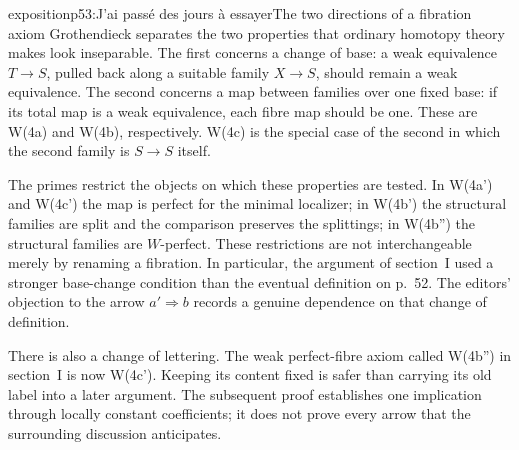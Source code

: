 \begin{dcomment}{exposition}{p53:J'ai passé des jours à essayer}{The two directions of a fibration axiom}
Grothendieck separates the two properties that ordinary homotopy theory makes look inseparable. The first concerns a change of base: a weak equivalence $T\to S$, pulled back along a suitable family $X\to S$, should remain a weak equivalence. The second concerns a map between families over one fixed base: if its total map is a weak equivalence, each fibre map should be one. These are W(4a) and W(4b), respectively. W(4c) is the special case of the second in which the second family is $S\to S$ itself.

The primes restrict the objects on which these properties are tested. In W(4a') and W(4c') the map is perfect for the minimal localizer; in W(4b') the structural families are split and the comparison preserves the splittings; in W(4b'') the structural families are $W$-perfect. These restrictions are not interchangeable merely by renaming a fibration. In particular, the argument of section~I used a stronger base-change condition than the eventual definition on p.~52. The editors' objection to the arrow $a'\Rightarrow b$ records a genuine dependence on that change of definition.

There is also a change of lettering. The weak perfect-fibre axiom called W(4b'') in section~I is now W(4c'). Keeping its content fixed is safer than carrying its old label into a later argument. The subsequent proof establishes one implication through locally constant coefficients; it does not prove every arrow that the surrounding discussion anticipates.
\end{dcomment}

